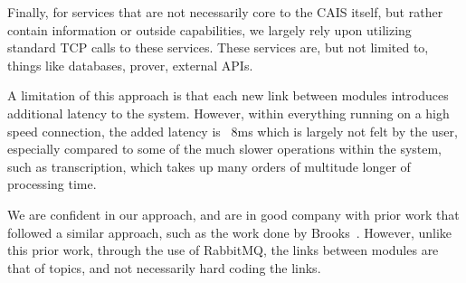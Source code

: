 Finally, for services that are not necessarily core to the CAIS itself, but
rather contain information or outside capabilities, we largely rely upon
utilizing standard TCP calls to these services. These services are, but not
limited to, things like databases, prover, external APIs.

A limitation of this approach is that each new link between modules introduces
additional latency to the system. However, within everything running on a high
speed connection, the added latency is ~8ms which is largely not felt by the
user, especially compared to some of the much slower operations within the
system, such as transcription, which takes up many orders of multitude longer
of processing time.

We are confident in our approach, and are in good company with  prior work that
followed a similar approach, such as the work done by
Brooks~\cite{brooks_intelligent_1997}. However, unlike this prior work, through
the use of RabbitMQ, the links between modules are that of topics, and not
necessarily hard coding the links.
